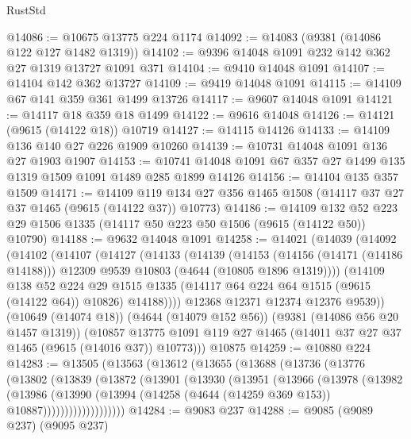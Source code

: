 \begin{lexlean}{RustStd}
\begin{coremodule}
@14086 := @10675 @13775 @224 @1174
@14092 := @14083 (@9381 (@14086 @122 @127 @1482 @1319))
@14102 := @9396 @14048 @1091 @232 @142 @362 @27 @1319 @13727 @1091 @371
@14104 := @9410 @14048 @1091
@14107 := @14104 @142 @362 @13727
@14109 := @9419 @14048 @1091
@14115 := @14109 @67 @141 @359 @361 @1499 @13726
@14117 := @9607 @14048 @1091
@14121 := @14117 @18 @359 @18 @1499
@14122 := @9616 @14048
@14126 := @14121 (@9615 (@14122 @18)) @10719
@14127 := @14115 @14126
@14133 := @14109 @136 @140 @27 @226 @1909 @10260
@14139 := @10731 @14048 @1091 @136 @27 @1903 @1907
@14153 := @10741 @14048 @1091 @67 @357 @27 @1499 @135 @1319 @1509 @1091 @1489 @285 @1899 @14126
@14156 := @14104 @135 @357 @1509
@14171 := @14109
    @119
    @134
    @27
    @356
    @1465
    @1508
    (@14117 @37 @27 @37 @1465 (@9615 (@14122 @37)) @10773)
@14186 := @14109
    @132
    @52
    @223
    @29
    @1506
    @1335
    (@14117 @50 @223 @50 @1506 (@9615 (@14122 @50)) @10790)
@14188 := @9632 @14048 @1091
@14258 := @14021
    (@14039
      (@14092
        (@14102
          (@14107
            (@14127
              (@14133
                (@14139
                  (@14153
                    (@14156 (@14171 (@14186 @14188)))
                    @12309
                    @9539
                    @10803
                    (@4644 (@10805 @1896 @1319))))
                (@14109
                  @138
                  @52
                  @224
                  @29
                  @1515
                  @1335
                  (@14117 @64 @224 @64 @1515 (@9615 (@14122 @64)) @10826)
                  @14188))))
          @12368
          @12371
          @12374
          @12376
          @9539))
      (@10649 (@14074 @18))
      (@4644 (@14079 @152 @56))
      (@9381 (@14086 @56 @20 @1457 @1319))
      (@10857 @13775 @1091 @119 @27 @1465 (@14011 @37 @27 @37 @1465 (@9615 (@14016 @37)) @10773)))
    @10875
@14259 := @10880 @224
@14283 := @13505
    (@13563
      (@13612
        (@13655
          (@13688
            (@13736
              (@13776
                (@13802
                  (@13839
                    (@13872
                      (@13901
                        (@13930
                          (@13951
                            (@13966
                              (@13978
                                (@13982
                                  (@13986
                                    (@13990
                                      (@13994
                                        (@14258 (@4644 (@14259 @369 @153)) @10887)))))))))))))))))))
@14284 := @9083 @237
@14288 := @9085 (@9089 @237) (@9095 @237)

\end{coremodule}
\end{lexlean}
